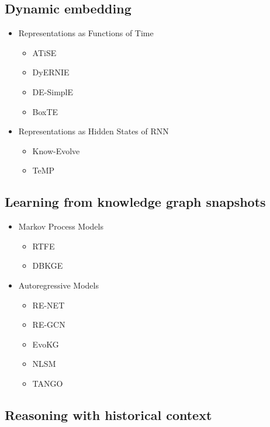 \documentclass[12pt]{article}
\begin{document}
\subsection{Dynamic embedding}

\begin{itemize}
    \item Representations as Functions of Time
    \begin{itemize}
        \item ATiSE
        \item DyERNIE
        \item DE-SimplE
        \item BoxTE
    \end{itemize}
    \item Representations as Hidden States of RNN
    \begin{itemize}
        \item Know-Evolve
        \item TeMP
    \end{itemize}
\end{itemize}

\subsection{Learning from knowledge graph snapshots}

\begin{itemize}
    \item Markov Process Models
    \begin{itemize}
        \item RTFE
        \item DBKGE
    \end{itemize}
    \item Autoregressive Models
    \begin{itemize}
        \item RE-NET
        \item RE-GCN
        \item EvoKG
        \item NLSM
        \item TANGO
    \end{itemize}
\end{itemize}

\subsection{Reasoning with historical context}
\end{document}
